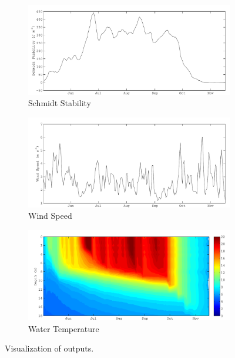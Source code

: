 \begin{figure}
\begin{subfigure}{\lafigsize}
      \caption{\label{fig:la:out:St}Schmidt Stability}
      \includegraphics[width=\linewidth]{figures/Sparkling_St.pdf}
    \end{subfigure}
    \begin{subfigure}{\lafigsize}
      \caption{\label{fig:la:out:wndSpd}Wind Speed}
      \includegraphics[width=\linewidth]{figures/Sparkling_wndSpd.pdf}
    \end{subfigure}
    \begin{subfigure}{\lafigsize}
      \caption{\label{fig:la:out:wTemp}Water Temperature}
      \includegraphics[width=\linewidth]{figures/Sparkling_wTemp.pdf}
    \end{subfigure}
    \caption{\label{fig:la:outputs:2}Visualization of \la outputs.}
  \end{figure}

